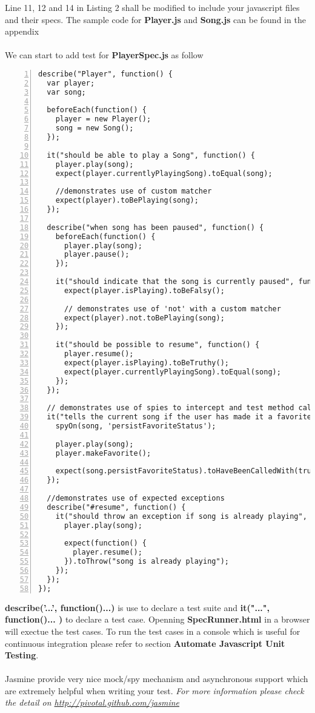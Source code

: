 \documentclass[a4paper,11pt]{article}
\begin{document}
Line 11, 12 and 14 in Listing 2  shall be modified to include your javascript files and their specs. The sample code for \textbf{Player.js} and \textbf{Song.js} can be found in the appendix\\\\
We can start to add test for \textbf{PlayerSpec.js} as follow\\
\begin{lstlisting}[label=some-code-test,caption=Player.js,style = customjava, numbers=left]
describe("Player", function() {
  var player;
  var song;

  beforeEach(function() {
    player = new Player();
    song = new Song();
  });

  it("should be able to play a Song", function() {
    player.play(song);
    expect(player.currentlyPlayingSong).toEqual(song);

    //demonstrates use of custom matcher
    expect(player).toBePlaying(song);
  });

  describe("when song has been paused", function() {
    beforeEach(function() {
      player.play(song);
      player.pause();
    });

    it("should indicate that the song is currently paused", function() {
      expect(player.isPlaying).toBeFalsy();

      // demonstrates use of 'not' with a custom matcher
      expect(player).not.toBePlaying(song);
    });

    it("should be possible to resume", function() {
      player.resume();
      expect(player.isPlaying).toBeTruthy();
      expect(player.currentlyPlayingSong).toEqual(song);
    });
  });

  // demonstrates use of spies to intercept and test method calls
  it("tells the current song if the user has made it a favorite", function() {
    spyOn(song, 'persistFavoriteStatus');

    player.play(song);
    player.makeFavorite();

    expect(song.persistFavoriteStatus).toHaveBeenCalledWith(true);
  });

  //demonstrates use of expected exceptions
  describe("#resume", function() {
    it("should throw an exception if song is already playing", function() {
      player.play(song);

      expect(function() {
        player.resume();
      }).toThrow("song is already playing");
    });
  });
});
\end{lstlisting}
\textbf{describe('...', function(){...})} is use to declare a test suite and \textbf{it("...", function(){...} )} to declare a test case. Openning \textbf{SpecRunner.html} in a browser will exectue the test cases. To run the test cases in a console which is useful for continuous integration please refer to section \textbf{Automate Javascript Unit Testing}.\\\\
Jasmine provide very nice mock/spy mechanism and asynchronous support which are extremely helpful when writing your test. \textit{For more information please check the detail on \url{http://pivotal.github.com/jasmine}}
\end{document}
